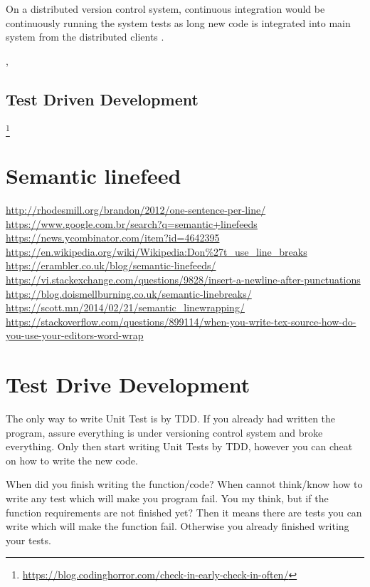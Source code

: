     On a distributed version control system,
    continuous integration would be continuously running the system tests
    as long new code is integrated into main system
    from the distributed clients \cite{continuousIntegration}.

    ,


    \subsection{Test Driven Development}


    \footnote{\url{https://blog.codinghorror.com/check-in-early-check-in-often/}}

    \cite{aspectOriented}



    \section{Semantic linefeed}

    \url{http://rhodesmill.org/brandon/2012/one-sentence-per-line/}
    \url{https://www.google.com.br/search?q=semantic+linefeeds}
    \url{https://news.ycombinator.com/item?id=4642395}
    \url{https://en.wikipedia.org/wiki/Wikipedia:Don%27t_use_line_breaks}
    \url{https://erambler.co.uk/blog/semantic-linefeeds/}
    \url{https://vi.stackexchange.com/questions/9828/insert-a-newline-after-punctuations}
    \url{https://blog.doismellburning.co.uk/semantic-linebreaks/}
    \url{https://scott.mn/2014/02/21/semantic_linewrapping/}
    \url{https://stackoverflow.com/questions/899114/when-you-write-tex-source-how-do-you-use-your-editors-word-wrap}



    \section{Test Drive Development}

    The only way to write Unit Test is by TDD.
    If you already had written the program,
    assure everything is under versioning control system and broke everything.
    Only then start writing Unit Tests by TDD,
    however you can cheat on how to write the new code.

    When did you finish writing the function/code? When cannot think/know how to write
    any test which will make you program fail.
    You my think,
    but if the function requirements are not finished yet? Then it means there are
    tests you can write which will make the function fail.
    Otherwise you already finished writing your tests.



